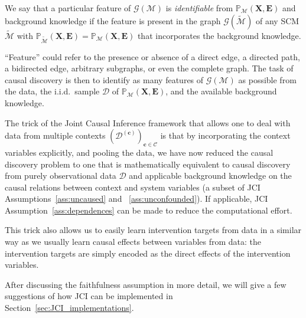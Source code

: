 \documentclass[twoside,11pt]{article}
\newcommand{\Prb}{\mathbb{P}}
\newcommand\B[1]{\bm{#1}}
\newcommand\C[1]{\mathcal{#1}}
\newcommand\BC[1]{\bm{\mathcal{#1}}}
\newcommand{\Joris}[1]{{\color{blue}#1}}
\begin{document}
\begin{definition}
  We say that a particular feature of $\C{G}(\C{M})$ is \emph{identifiable} from $\Prb_{\C{M}}(\B{X},\B{E})$ and background knowledge if the feature is present in the graph $\C{G}(\tilde{\C{M}})$ of any SCM $\tilde{\C{M}}$ with $\Prb_{\tilde{\C{M}}}(\B{X},\B{E}) = \Prb_{\C{M}}(\B{X},\B{E})$ that incorporates the background knowledge.
\end{definition}
``Feature'' could refer to the presence or absence of a direct edge, a directed path, a bidirected edge, arbitrary subgraphs, or even the complete graph. The task of causal discovery is then to identify as many features of $\C{G}(\C{M})$ as possible from the data, the i.i.d.\ sample $\C{D}$ of $\Prb_{\C{M}}(\B{X},\B{E})$, and the available background knowledge.

The trick of the Joint Causal Inference framework that allows one to deal with data from multiple contexts $(\C{D}^{(\B{c})})_{\B{c}\in\BC{C}}$ is that by
incorporating the context variables explicitly, and pooling the data, we have now reduced the causal discovery problem
to one that is mathematically equivalent to causal discovery from purely observational data $\C{D}$ and applicable 
background knowledge on the causal relations between context and system variables (a subset of JCI Assumptions~\ref{ass:uncaused} 
and ~\ref{ass:unconfounded}). If applicable, JCI Assumption~\ref{ass:dependences} can be made to reduce the computational effort.

This trick also allows us to easily learn intervention targets from data in a similar way as
we usually learn causal effects between variables from data: the intervention targets are
simply encoded as the direct effects of the intervention variables.

After discussing the faithfulness assumption in more detail, we will give a few suggestions of how JCI can be implemented in Section~\ref{sec:JCI_implementations}.

\end{document}
